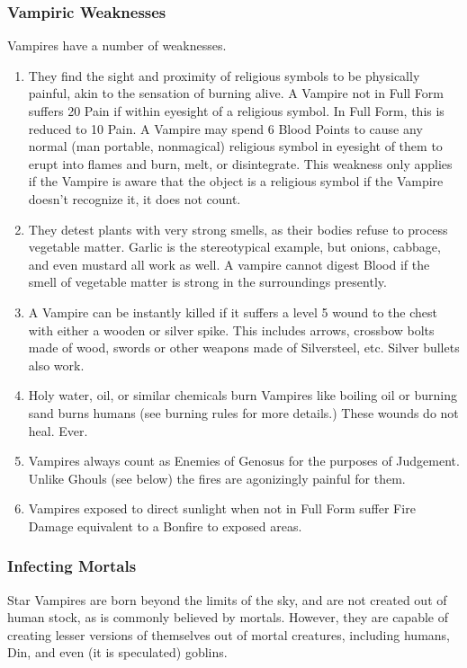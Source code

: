 \documentclass[oneside,11pt,english]{book}
\begin{document}
\subsubsection{Vampiric Weaknesses}
Vampires have a number of weaknesses.
\begin{enumerate}
	\item They find the sight and proximity of religious symbols to be physically painful, akin to the 
		sensation of burning alive. A Vampire not in Full Form suffers 20 Pain if within eyesight of a 
		religious symbol. In Full Form, this is reduced to 10 Pain. A Vampire may spend 6 Blood Points 
		to cause any normal (man portable, nonmagical) religious symbol in eyesight of them to erupt 
		into flames and burn, melt, or disintegrate. This weakness only applies if the Vampire is aware 
		that the object is a religious symbol if the Vampire doesn't recognize it, it does not count. 
	\item They detest plants with very strong smells, as their bodies refuse to process vegetable 
		matter. Garlic is the stereotypical example, but onions, cabbage, and even mustard all work as 
		well. A vampire cannot digest Blood if the smell of vegetable matter is strong in the 
		surroundings presently. 
	\item A Vampire can be instantly killed if it suffers a level 5 wound to the chest with either a wooden 
		or silver spike. This includes arrows, crossbow bolts made of wood, swords or other weapons 
		made of Silversteel, etc. Silver bullets also work. 
	\item Holy water, oil, or similar chemicals burn Vampires like boiling oil or burning sand burns 
		humans (see burning rules for more details.) These wounds do not heal. Ever.
	\item Vampires always count as Enemies of Genosus for the purposes of Judgement. Unlike 
		Ghouls (see below) the fires are agonizingly painful for them. 
	\item Vampires exposed to direct sunlight when not in Full Form suffer Fire Damage equivalent to a 
		Bonfire to exposed areas. 
\end{enumerate}

\subsubsection{Infecting Mortals}
Star Vampires are born beyond the limits of the sky, and are not created out of human stock, as 
is commonly believed by mortals. However, they are capable of creating lesser versions of 
themselves out of mortal creatures, including humans, Din, and even (it is speculated) goblins. 
\end{document}
